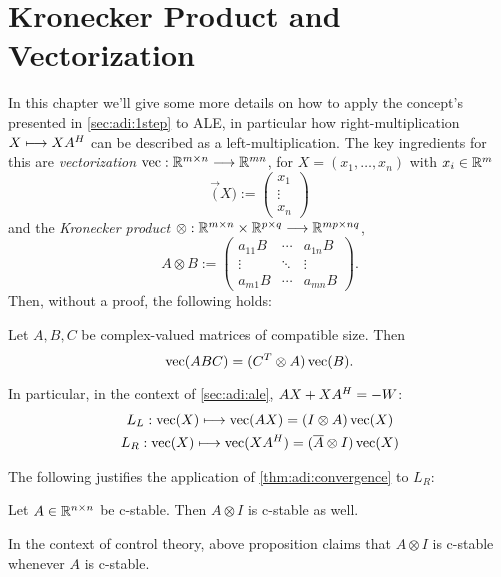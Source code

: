 \chapter{Kronecker Product and Vectorization}
\label{sec:vectorization}

In this chapter we'll give some more details on how to apply the concept's presented in \autoref{sec:adi:1step} to \ac{ALE},
in particular how right-multiplication $X \longmapsto XA^H$ can be described as a left-multiplication.
The key ingredients for this are \emph{vectorization} $\operatorname{vec} : \mathbb{R}^{m\times n} \longrightarrow \mathbb{R}^{mn}$,
\eg for $X=(x_1,\ldots, x_n)$ with $x_i\in\mathbb{R}^m$
\begin{equation}
  \vec(X) := \begin{pmatrix}
    x_1 \\
    \vdots \\
    x_n
  \end{pmatrix}
\end{equation}
and the \emph{Kronecker product} $\otimes : \mathbb{R}^{m\times n} \times \mathbb{R}^{p\times q} \longrightarrow \mathbb{R}^{mp \times nq}$,
\begin{equation}
  A \otimes B := \begin{pmatrix}
    a_{11} B & \cdots & a_{1n} B \\
    \vdots   & \ddots & \vdots \\
    a_{m1} B & \cdots & a_{mn} B
  \end{pmatrix}
  .
\end{equation}
Then, without a proof, the following holds:

\begin{proposition}
  Let $A, B, C$ be complex-valued matrices of compatible size. Then
  \begin{equation*}
    \operatorname{vec}(ABC) = (C^T \otimes A) \operatorname{vec}(B)
    .
  \end{equation*}
\end{proposition}

In particular, in the context of \autoref{sec:adi:ale},
$AX + XA^H = -W$:
\begin{gather}
  L_L : \vec(X) \mapsto \vec(AX) = (I \otimes A) \vec(X) \\
  L_R : \vec(X) \mapsto \vec(XA^\HT) = (\conj A \otimes I) \vec(X)
\end{gather}

The following justifies the application of \autoref{thm:adi:convergence} to $L_R$:

\begin{proposition}
  Let $A\in\mathbb{R}^{n\times n}$ be c-stable. Then $A \otimes I$ is c-stable as well.
\end{proposition}
\begin{remark}
  In the context of control theory, above proposition claims that $A \otimes I$ is c-stable whenever $A$ is c-stable.
\end{remark}
